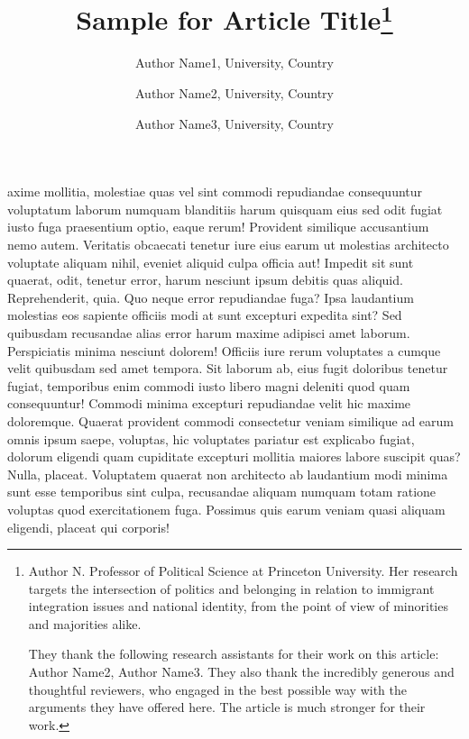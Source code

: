 \documentclass[autowc]{CUP-JNL-PPS}
\begin{document}
\begin{Frontmatter}
\title[Article Title]{Sample for Article Title\thanks{Author N.  Professor of Political Science at Princeton University. Her
research targets the intersection of politics and belonging in
relation to immigrant integration issues and national identity, from the point of view of minorities and majorities alike.

They thank the following research assistants for their work on this article: Author Name2, Author Name3. They also thank the incredibly generous and thoughtful reviewers, who engaged in the best possible way with the arguments they have offered here. The article is much stronger for their work. }}

\author{Author Name1, University, Country}
\author{Author Name2, University, Country}
\author{Author Name3, University, Country}


\end{Frontmatter}


axime mollitia, molestiae quas vel sint commodi repudiandae consequuntur voluptatum laborum
numquam blanditiis harum quisquam eius sed odit fugiat iusto fuga praesentium
optio, eaque rerum! Provident similique accusantium nemo autem. Veritatis
obcaecati tenetur iure eius earum ut molestias architecto voluptate aliquam
nihil, eveniet aliquid culpa officia aut! Impedit sit sunt quaerat, odit,
tenetur error, harum nesciunt ipsum debitis quas aliquid. Reprehenderit,
quia. Quo neque error repudiandae fuga? Ipsa laudantium molestias eos
sapiente officiis modi at sunt excepturi expedita sint? Sed quibusdam
recusandae alias error harum maxime adipisci amet laborum. Perspiciatis
minima nesciunt dolorem! Officiis iure rerum voluptates a cumque velit
quibusdam sed amet tempora. Sit laborum ab, eius fugit doloribus tenetur
fugiat, temporibus enim commodi iusto libero magni deleniti quod quam
consequuntur! Commodi minima excepturi repudiandae velit hic maxime
doloremque. Quaerat provident commodi consectetur veniam similique ad
earum omnis ipsum saepe, voluptas, hic voluptates pariatur est explicabo
fugiat, dolorum eligendi quam cupiditate excepturi mollitia maiores labore
suscipit quas? Nulla, placeat. Voluptatem quaerat non architecto ab laudantium
modi minima sunt esse temporibus sint culpa, recusandae aliquam numquam
totam ratione voluptas quod exercitationem fuga. Possimus quis earum veniam
quasi aliquam eligendi, placeat qui corporis!
\end{document}
